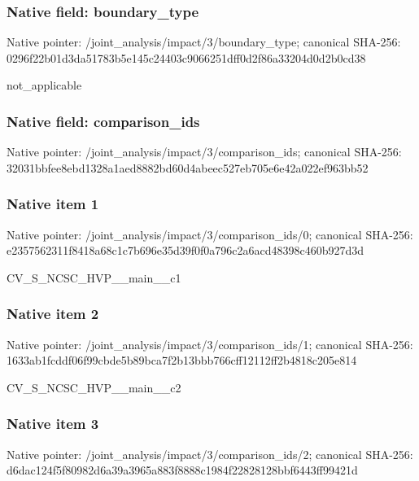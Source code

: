 \documentclass[10pt,a4paper]{article}
\begin{document}
\subsubsection{Native field: boundary\_\allowbreak{}type}
Native pointer: /joint\_\allowbreak{}analysis/impact/3/boundary\_\allowbreak{}type; canonical SHA-256: 0296f22b01d3da51783b5e145c24403c9066251dff0d2f86a33204d0d2b0cd38

\begingroup\raggedright\sloppy not\_\allowbreak{}applicable\par\endgroup

\subsubsection{Native field: comparison\_\allowbreak{}ids}
Native pointer: /joint\_\allowbreak{}analysis/impact/3/comparison\_\allowbreak{}ids; canonical SHA-256: 32031bbfee8ebd1328a1aed8882bd60d4abeec527eb705e6e42a022ef963bb52

\subsubsection{Native item 1}
Native pointer: /joint\_\allowbreak{}analysis/impact/3/comparison\_\allowbreak{}ids/0; canonical SHA-256: e2357562311f8418a68c1c7b696e35d39f0f0a796c2a6acd48398c460b927d3d

\begingroup\raggedright\sloppy CV\_\allowbreak{}S\_\allowbreak{}NCSC\_\allowbreak{}HVP\_\allowbreak{}\_\allowbreak{}main\_\allowbreak{}\_\allowbreak{}c1\par\endgroup

\subsubsection{Native item 2}
Native pointer: /joint\_\allowbreak{}analysis/impact/3/comparison\_\allowbreak{}ids/1; canonical SHA-256: 1633ab1fcddf06f99cbde5b89bca7f2b13bbb766cff12112ff2b4818c205e814

\begingroup\raggedright\sloppy CV\_\allowbreak{}S\_\allowbreak{}NCSC\_\allowbreak{}HVP\_\allowbreak{}\_\allowbreak{}main\_\allowbreak{}\_\allowbreak{}c2\par\endgroup

\subsubsection{Native item 3}
Native pointer: /joint\_\allowbreak{}analysis/impact/3/comparison\_\allowbreak{}ids/2; canonical SHA-256: d6dac124f5f80982d6a39a3965a883f8888c1984f22828128bbf6443ff99421d
\end{document}
